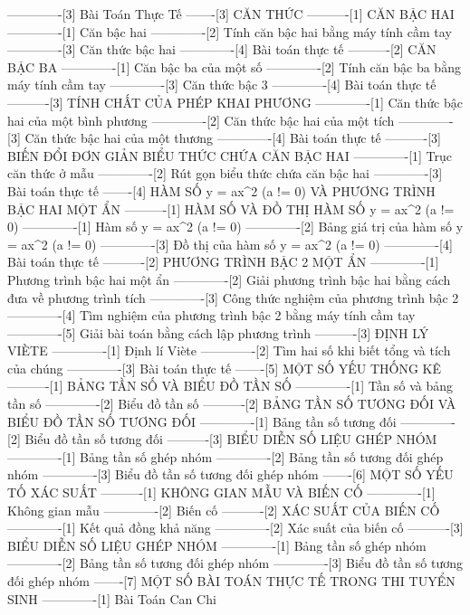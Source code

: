 -------------[3] Bài Toán Thực Tế
-------[3] CĂN THỨC
----------[1] CĂN BẬC HAI
-------------[1] Căn bậc hai
-------------[2] Tính căn bậc hai bằng máy tính cầm tay
-------------[3] Căn thức bậc hai
-------------[4] Bài toán thực tế
----------[2] CĂN BẬC BA
-------------[1] Căn bậc ba của một số
-------------[2] Tính căn bậc ba bằng máy tính cầm tay
-------------[3] Căn thức bậc 3
-------------[4] Bài toán thực tế
----------[3] TÍNH CHẤT CỦA PHÉP KHAI PHƯƠNG
-------------[1] Căn thức bậc hai của một bình phương
-------------[2] Căn thức bậc hai của một tích
-------------[3] Căn thức bậc hai của một thương
-------------[4] Bài toán thực tế
----------[3] BIẾN ĐỔI ĐƠN GIẢN BIỂU THỨC CHỨA CĂN BẬC HAI
-------------[1] Trục căn thức ở mẫu
-------------[2] Rút gọn biểu thức chứa căn bậc hai
-------------[3] Bài toán thực tế
-------[4] HÀM SỐ y = ax^2 (a != 0) VÀ PHƯƠNG TRÌNH BẬC HAI MỘT ẨN
----------[1] HÀM SỐ VÀ ĐỒ THỊ HÀM SỐ y = ax^2 (a != 0)
-------------[1] Hàm số y = ax^2 (a != 0)
-------------[2] Bảng giá trị của hàm số y = ax^2 (a != 0)
-------------[3] Đồ thị của hàm số y = ax^2 (a != 0)
-------------[4] Bài toán thực tế
----------[2] PHƯƠNG TRÌNH BẬC 2 MỘT ẨN
-------------[1] Phương trình bậc hai một ẩn
-------------[2] Giải phương trình bậc hai bằng cách đưa về phương trình tích
-------------[3] Công thức nghiệm của phương trình bậc 2
-------------[4] Tìm nghiệm của phương trình bậc 2 bằng máy tính cầm tay
-------------[5] Giải bài toán bằng cách lập phương trình
----------[3] ĐỊNH LÝ VIÈTE
-------------[1] Định lí Viète
-------------[2] Tìm hai số khi biết tổng và tích của chúng
-------------[3] Bài toán thực tế
-------[5] MỘT SỐ YẾU THỐNG KÊ
----------[1] BẢNG TẦN SỐ VÀ BIỂU ĐỒ TẦN SỐ
-------------[1] Tần số và bảng tần số
-------------[2] Biểu đồ tần số
----------[2] BẢNG TẦN SỐ TƯƠNG ĐỐI VÀ BIỂU ĐỒ TẦN SỐ TƯƠNG ĐỐI
-------------[1] Bảng tần số tương đối
-------------[2] Biểu đồ tần số tương đối
----------[3] BIỂU DIỄN SỐ LIỆU GHÉP NHÓM
-------------[1] Bảng tần số ghép nhóm
-------------[2] Bảng tần số tương đối ghép nhóm
-------------[3] Biểu đồ tần số tương đối ghép nhóm
-------[6] MỘT SỐ YẾU TỐ XÁC SUẤT
----------[1] KHÔNG GIAN MẪU VÀ BIẾN CỐ
-------------[1] Không gian mẫu
-------------[2] Biến cố
----------[2] XÁC SUẤT CỦA BIẾN CỐ
-------------[1] Kết quả đồng khả năng
-------------[2] Xác suất của biến cố
----------[3] BIỂU DIỄN SỐ LIỆU GHÉP NHÓM
-------------[1] Bảng tần số ghép nhóm
-------------[2] Bảng tần số tương đối ghép nhóm
-------------[3] Biểu đồ tần số tương đối ghép nhóm
-------[7] MỘT SỐ BÀI TOÁN THỰC TẾ TRONG THI TUYỂN SINH
-------------[1] Bài Toán Can Chi
